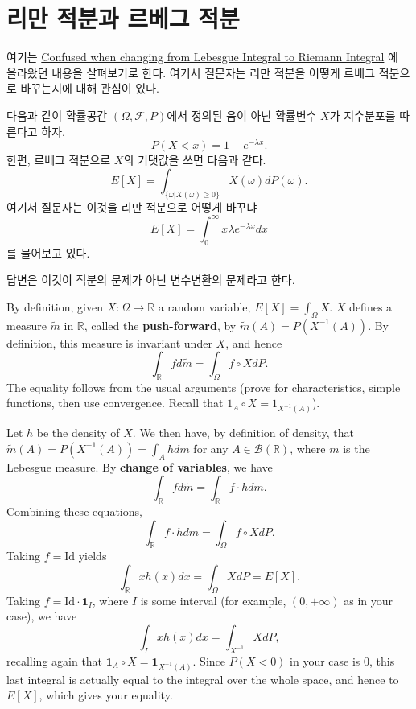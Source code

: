 \documentclass[
  letterpaper,
  DIV=11,
  numbers=noendperiod]{scrreprt}
\theoremstyle{plain}
\theoremstyle{definition}
\theoremstyle{definition}
\theoremstyle{plain}
\theoremstyle{plain}
\theoremstyle{remark}
\begin{document}
\section{리만 적분과 르베그
적분}\label{uxb9acuxb9cc-uxc801uxbd84uxacfc-uxb974uxbca0uxadf8-uxc801uxbd84}

여기는
\href{https://math.stackexchange.com/questions/2958787/confused-when-changing-from-lebesgue-integral-to-riemann-integral}{Confused
when changing from Lebesgue Integral to Riemann Integral} 에 올라왔던
내용을 살펴보기로 한다. 여기서 질문자는 리만 적분을 어떻게 르베그
적분으로 바꾸는지에 대해 관심이 있다.

다음과 같이 확률공간 \((\Omega, \mathcal{F}, P)\)에서 정의된 음이 아닌
확률변수 \(X\)가 지수분포를 따른다고 하자. \[
P(X<x) = 1-e^{-\lambda x}.
\] 한편, 르베그 적분으로 \(X\)의 기댓값을 쓰면 다음과 같다. \[
E[X] = \int_{\{\omega | X(\omega) \geq 0 \}} X(\omega) dP(\omega).
\] 여기서 질문자는 이것을 리만 적분으로 어떻게 바꾸냐 \[
E[X] = \int_0^\infty x \lambda e^{-\lambda x}dx
\] 를 물어보고 있다.

답변은 이것이 적분의 문제가 아닌 변수변환의 문제라고 한다.

By definition, given \(X: \Omega \rightarrow \mathbb{R}\) a random
variable, \(E[X] = \int_{\Omega} X\). \(X\) defines a measure
\(\tilde{m}\) in \(\mathbb{R}\), called the \textbf{push-forward}, by
\(\tilde{m}(A) = P(X^{-1}(A))\). By definition, this measure is
invariant under \(X\), and hence \[
\int_{\mathbb{R}} f d\tilde{m} = \int_{\Omega} f \circ X dP.
\] The equality follows from the usual arguments (prove for
characteristics, simple functions, then use convergence. Recall that
\(1_A \circ X = 1_{X^{-1}(A)}\)).

Let \(h\) be the density of \(X\). We then have, by definition of
density, that \(\tilde{m}(A) = P(X^{-1}(A)) = \int_A h dm\) for any
\(A \in \mathcal{B}(\mathbb{R})\), where \(m\) is the Lebesgue measure.
By \textbf{change of variables}, we have \[
\int_{\mathbb{R}}f d\tilde{m} = \int_{\mathbb{R}} f\cdot h dm.
\] Combining these equations, \[
\int_{\mathbb{R}} f \cdot h dm =\int_{\Omega} f \circ X dP.
\] Taking \(f=\text{Id}\) yields \[
\int_{\mathbb{R}}xh(x)dx = \int_{\Omega} X dP = E[X].
\] Taking \(f = \text{Id} \cdot \mathbf{1}_{I}\), where \(I\) is some
interval (for example, \((0, +\infty)\) as in your case), we have \[
\int_{I}xh(x)dx = \int_{X^{-1}}XdP,
\] recalling again that
\(\mathbf{1}_A \circ X = \mathbf{1}_{X^{-1}(A)}\). Since \(P(X<0)\) in
your case is \(0\), this last integral is actually equal to the integral
over the whole space, and hence to \(E[X]\), which gives your equality.
\end{document}
